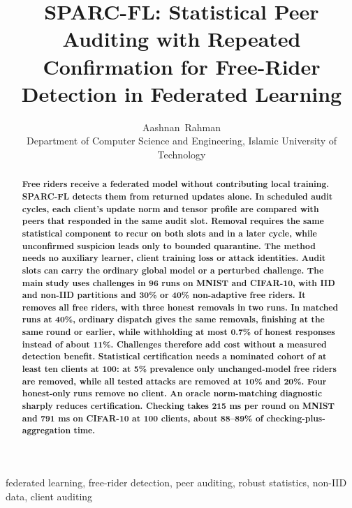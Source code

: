 \documentclass[journal]{IEEEtran}
\title{SPARC-FL: Statistical Peer Auditing with Repeated Confirmation for Free-Rider Detection in Federated Learning}
\author{Aashnan~Rahman\\{\normalsize Department of Computer Science and Engineering, Islamic University of Technology}}
\makeatletter
\renewcommand{\section}{\@startsection{section}{1}{\z@}{1.5ex}{0.7ex}{\normalfont\normalsize\centering\scshape}}
\makeatother
\begin{document}
\maketitle
\raggedbottom
\setlength{\parskip}{0pt plus 2pt minus 0.5pt}
\makeatletter
\def\@textbottom{\vskip\z@ plus 6pt}
\makeatother
\setlength{\abovedisplayskip}{6pt plus 1pt minus 1pt}
\setlength{\belowdisplayskip}{6pt plus 1pt minus 1pt}
\setlength{\abovedisplayshortskip}{3pt plus 1pt minus 1pt}
\setlength{\belowdisplayshortskip}{3pt plus 1pt minus 1pt}

\begin{abstract}
\bfseries
Free riders receive a federated model without contributing local training.
SPARC-FL detects them from returned updates alone. In scheduled audit
cycles, each client's update norm and tensor profile are compared with
peers that responded in the same audit slot. Removal requires the same
statistical component to recur on both slots and in a later cycle, while
unconfirmed suspicion leads only to bounded quarantine. The method needs
no auxiliary learner, client training loss or attack identities. Audit
slots can carry the ordinary global model or a perturbed challenge. The
main study uses challenges in 96 runs on MNIST and CIFAR-10, with IID and
non-IID partitions and 30\% or 40\% non-adaptive free riders. It removes
all free riders, with three honest removals in two runs. In matched runs
at 40\%, ordinary dispatch gives the same removals, finishing at the same
round or earlier, while withholding at most 0.7\% of honest responses
instead of about 11\%. Challenges therefore add cost without a measured
detection benefit. Statistical certification needs a nominated cohort of
at least ten clients at 100: at 5\% prevalence only unchanged-model free
riders are removed, while all tested attacks are removed at 10\% and 20\%.
Four honest-only runs remove no client. An oracle norm-matching diagnostic
sharply reduces certification. Checking takes 215 ms per round on MNIST
and 791 ms on CIFAR-10 at 100 clients, about 88--89\% of
checking-plus-aggregation time.
\end{abstract}

\begin{IEEEkeywords}
federated learning, free-rider detection, peer auditing, robust statistics,
non-IID data, client auditing
\end{IEEEkeywords}

\section{Introduction}
\end{document}

